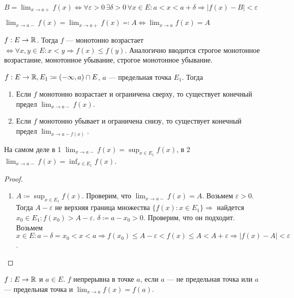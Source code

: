\begin{remark}
    $B = \lim_{x \to a+} f(x) \iff \forall \varepsilon > 0 \, \exists \delta > 0 \, \forall x \in E: a < x < a + \delta \Rightarrow |f(x) - B| < \varepsilon$
\end{remark}
\begin{remark}
    $\lim_{x\to a-} f(x) = \lim_{x \to a+} f(x) \eqqcolon A \iff \lim_{x \to a} f(x) = A$
\end{remark}
\begin{definition}
    $f: E \to \mathbb{R}$. Тогда  $f$ --- монотонно возрастает $\iff \forall x, y \in E: x < y \Rightarrow f(x) \le f(y)$.
    Аналогично вводится строгое монотонное возрастание, монотонное убывание, строгое монотонное убывание.
\end{definition}
\begin{theorem}
    $f: E \to \mathbb{R}, E_1 \coloneqq (-\infty, a) \cap E$,  $a$ --- предельная точка  $E_1$. Тогда
     \begin{enumerate}
         \item Если $f$ монотонно возрастает и ограничена сверху, то существует конечный предел  $\lim_{x \to a-} f(x)$.
         \item Если $f$ монотонно убывает и ограничена снизу, то существует конечный предел  $\lim_{x \to a- f(x)}$.
    \end{enumerate}
\end{theorem}
\begin{remark}
    На самом деле в 1  $\lim_{x \to a-} f(x) = \sup_{x \in E_1} f(x)$, в  2  $\lim_{x \to a-} f(x) = \inf_{x \in E_1} f(x)$.
\end{remark}
\begin{proof}
    \slashn
    \begin{enumerate}
        \item $A \coloneqq \sup_{x \in E_1} f(x)$. Проверим, что  $\lim_{x \to a-} f(x) = A$. Возьмем  $\varepsilon > 0$. Тогда  $A - \varepsilon$ не верхняя граница множества $\{f(x): x \in E_1\} \Rightarrow$ найдется $x_0 \in E_1: f(x_0) > A - \varepsilon$. $\delta \coloneqq a - x_0 > 0$. Проверим, что он подходит. Возьмем  $x \in E: a - \delta = x_0 < x < a \Rightarrow f(x_0) \le A-\varepsilon < f(x) \le A < A + \varepsilon \Rightarrow |f(x) - A| < \varepsilon$.
    \end{enumerate}
\end{proof}
\begin{definition}
    $f: E \to \mathbb{R}$ и  $a \in E$.  $f$ непрерывна в точке  $a$, если  $a$ --- не предельная точка или  $a$ --- предельная точка и  $\lim_{x \to a} f(x) = f(a)$.
\end{definition}
